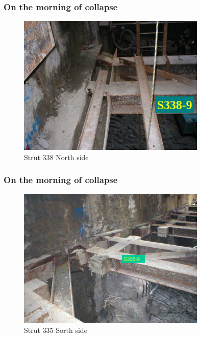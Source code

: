 \documentclass[notes]{beamer}
\begin{document}
\begin{frame}
\frametitle{On the morning of collapse}
\begin{figure}[ht]
	\centering
	\includegraphics[width=0.8\textwidth]{figs/strut-338.png}
	\caption*{Strut 338 North side}
\end{figure}
\end{frame}

\begin{frame}
\frametitle{On the morning of collapse}
\begin{figure}[ht]
	\centering
	\includegraphics[width=0.8\textwidth]{figs/strut-335-south.png}
	\caption*{Strut 335 Sorth side}
\end{figure}
\end{frame}
\end{document}
